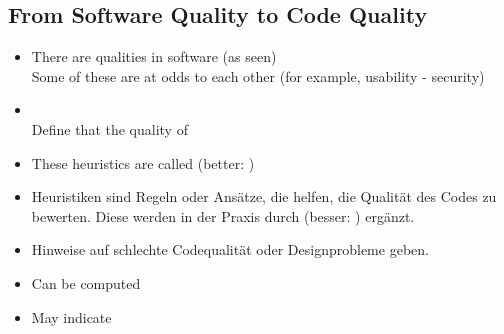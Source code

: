 \subsection{From Software Quality to Code Quality}
\begin{defBox}[title=How to measure software quality?]
    \begin{itemize}
        \item There are  qualities in software (as seen)\\
        Some of these are at odds to each other (for example, usability - security)
        \item {}\\
        Define  that  the quality of 
        \item These heuristics are called  (better: )
    \end{itemize}
\end{defBox}
\begin{infoBox}[title=Ansätze zur Bewertung der Softwarequalität]
    \begin{itemize}
        \item {} Heuristiken sind Regeln oder Ansätze, die helfen, die Qualität des Codes zu bewerten. Diese werden in der Praxis durch  (besser: ) ergänzt.
        \item {} Hinweise auf schlechte Codequalität oder Designprobleme geben.
    \end{itemize}
\end{infoBox}
\begin{defBox}[title=Software Metrics Pro]
    \begin{itemize}
        \item Can be computed 
        \item May indicate 
    \end{itemize}
\end{defBox}
